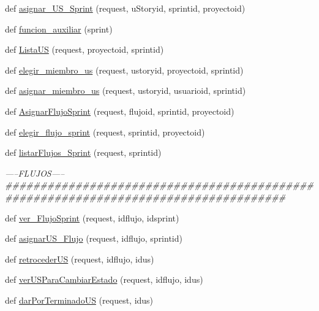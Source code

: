 \begin{DoxyCompactItemize}
\item 
def \hyperlink{namespace_sprints_1_1views_a394eb2b9572fdcf55fafbc837ba7e635}{asignar\+\_\+\+U\+S\+\_\+\+Sprint} (request, u\+Storyid, sprintid, proyectoid)
\item 
def \hyperlink{namespace_sprints_1_1views_acc929a781cbb85336d14e43db6a64ab2}{funcion\+\_\+auxiliar} (sprint)
\item 
def \hyperlink{namespace_sprints_1_1views_a0cb197bdfdbcf9dbd6625ca3557b7e3b}{Lista\+US} (request, proyectoid, sprintid)
\item 
def \hyperlink{namespace_sprints_1_1views_a604082120f0caf492b1788b310b562af}{elegir\+\_\+miembro\+\_\+us} (request, ustoryid, proyectoid, sprintid)
\item 
def \hyperlink{namespace_sprints_1_1views_a100600de490fd5483fd8b6c2753cf8ca}{asignar\+\_\+miembro\+\_\+us} (request, ustoryid, usuarioid, sprintid)
\item 
def \hyperlink{namespace_sprints_1_1views_acefd049a96bbbb96e88cb3c00ba87244}{Asignar\+Flujo\+Sprint} (request, flujoid, sprintid, proyectoid)
\item 
def \hyperlink{namespace_sprints_1_1views_aa56a584b7e273723c1237bf1fec6d6e7}{elegir\+\_\+flujo\+\_\+sprint} (request, sprintid, proyectoid)
\item 
def \hyperlink{namespace_sprints_1_1views_a01d2723e19911845ceeeac6fc081291e}{listar\+Flujos\+\_\+\+Sprint} (request, sprintid)
\begin{DoxyCompactList}\small\item\em -----F\+L\+U\+J\+OS-----\#\#\#\#\#\#\#\#\#\#\#\#\#\#\#\#\#\#\#\#\#\#\#\#\#\#\#\#\#\#\#\#\#\#\#\#\#\#\#\#\#\#\#\#\#\#\#\#\#\#\#\#\#\#\#\#\#\#\#\#\#\#\#\#\#\#\#\#\#\#\#\#\#\#\#\#\#\#\#\#\#\#\#\# \end{DoxyCompactList}\item 
def \hyperlink{namespace_sprints_1_1views_a41f2de0619ea3a9fb32295ecbbf5dd57}{ver\+\_\+\+Flujo\+Sprint} (request, idflujo, idsprint)
\item 
def \hyperlink{namespace_sprints_1_1views_a00a8fcdfa2cd6b706fbd412b67576f27}{asignar\+U\+S\+\_\+\+Flujo} (request, idflujo, sprintid)
\item 
def \hyperlink{namespace_sprints_1_1views_ac56e6b8c4fa27b18eda5323af515c30b}{retroceder\+US} (request, idflujo, idus)
\item 
def \hyperlink{namespace_sprints_1_1views_abdab3ea6f6a4b13b546df8d2a42d3541}{ver\+U\+S\+Para\+Cambiar\+Estado} (request, idflujo, idus)
\item 
def \hyperlink{namespace_sprints_1_1views_ae3a9f8a82ade66a4692c5e9d1e9e7ec5}{dar\+Por\+Terminado\+US} (request, idus)

\end{DoxyCompactItemize}
